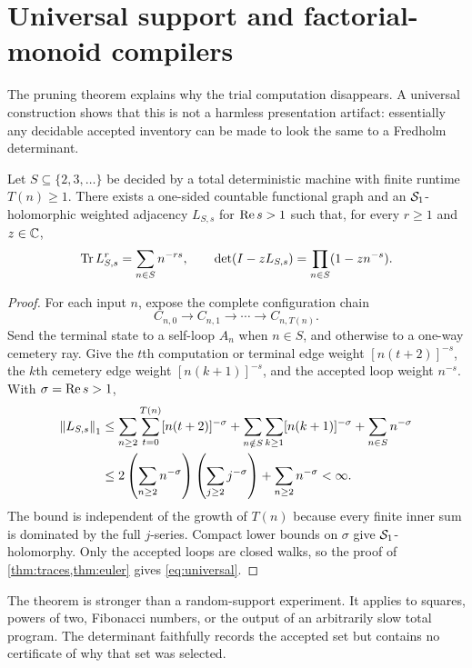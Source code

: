 \section{Universal support and factorial-monoid compilers}
\label{sec:compiler}

The pruning theorem explains why the trial computation disappears.  A
universal construction shows that this is not a harmless presentation
artifact: essentially any decidable accepted inventory can be made to look
the same to a Fredholm determinant.

\begin{theorem}
\label{thm:universal}
Let $S\subseteq\{2,3,\ldots\}$ be decided by a total deterministic machine
with finite runtime $T(n)\ge1$.  There exists a one-sided countable
functional graph and an $\mathcal S_1$-holomorphic weighted adjacency $L_{S,s}$ for
$\operatorname{Re} s>1$ such that, for every $r\ge1$ and $z\in\mathbb C$,
\begin{equation}
\operatorname{Tr} L_{S,s}^r=\sum_{n\in S}n^{-rs},
\qquad
\det(I-zL_{S,s})=\prod_{n\in S}(1-zn^{-s}).
\label{eq:universal}
\end{equation}
\end{theorem}

\begin{proof}
For each input $n$, expose the complete configuration chain
\[
C_{n,0}\longrightarrow C_{n,1}\longrightarrow\cdots
\longrightarrow C_{n,T(n)}.
\]
Send the terminal state to a self-loop $A_n$ when $n\in S$, and otherwise to
a one-way cemetery ray.  Give the $t$th computation or terminal edge weight
$[n(t+2)]^{-s}$, the $k$th cemetery edge weight $[n(k+1)]^{-s}$, and the
accepted loop weight $n^{-s}$.  With $\sigma=\operatorname{Re} s>1$,
\[
\begin{aligned}
\left\lVert L_{S,s}\right\rVert_1
&\le \sum_{n\ge2}\sum_{t=0}^{T(n)}[n(t+2)]^{-\sigma}
 +\sum_{n\notin S}\sum_{k\ge1}[n(k+1)]^{-\sigma}
 +\sum_{n\in S}n^{-\sigma}\\
&\le 2\left(\sum_{n\ge2}n^{-\sigma}\right)
       \left(\sum_{j\ge2}j^{-\sigma}\right)
 +\sum_{n\ge2}n^{-\sigma}<\infty.
\end{aligned}
\]
The bound is independent of the growth of $T(n)$ because every finite inner
sum is dominated by the full $j$-series.  Compact lower bounds on $\sigma$
give $\mathcal S_1$-holomorphy.  Only the accepted loops are closed walks, so the
proof of \cref{thm:traces,thm:euler} gives \eqref{eq:universal}.
\end{proof}

The theorem is stronger than a random-support experiment.  It applies to
squares, powers of two, Fibonacci numbers, or the output of an arbitrarily
slow total program.  The determinant faithfully records the accepted set but
contains no certificate of why that set was selected.

